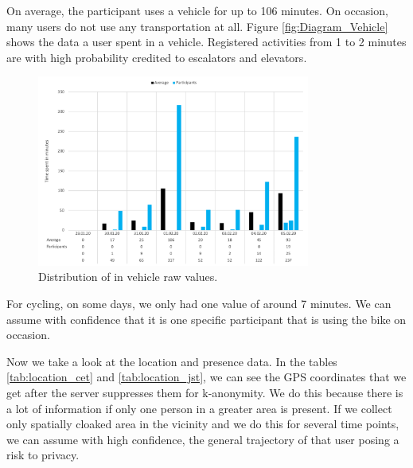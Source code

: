 On average, the participant uses a vehicle for up to 106 minutes. On occasion, many users do not use any transportation at all. Figure \ref{fig:Diagram_Vehicle} shows the data a user spent in a vehicle. Registered activities from 1 to 2 minutes are with high probability credited to escalators and elevators.  

\begin{figure}[htbp]
  \centering
  \includegraphics[width=0.8\textwidth]{figures/diagram_vehicle.png}
  \caption{Distribution of in vehicle raw values.} \label{fig:diagram_vehicle}
\end{figure}

For cycling, on some days, we only had one value of around 7 minutes. We can assume with confidence that it is one specific participant that is using the bike on occasion.

Now we take a look at the location and presence data. In the tables \ref{tab:location_cet} and \ref{tab:location_jst}, we can see the GPS coordinates that we get after the server suppresses them for k-anonymity. We do this because there is a lot of information if only one person in a greater area is present. If we collect only spatially cloaked area in the vicinity and we do this for several time points, we can assume with high confidence, the general trajectory of that user posing a risk to privacy.


